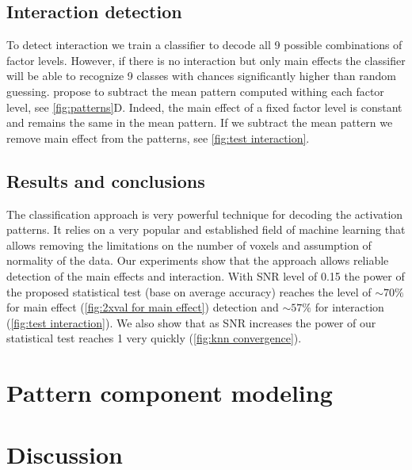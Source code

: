\documentclass[paper=a4,fontsize=12pt]{scrartcl}
\numberwithin{equation}{section} %
\numberwithin{figure}{section} %
\numberwithin{table}{section} %
\begin{document}
\subsection{Interaction detection}

To detect interaction  we train a classifier to decode all 9 possible combinations of factor levels. However, if there is no interaction but only main effects the classifier will be able to recognize 9 classes with chances significantly higher than random guessing. \cite{Kornysheva2014} propose to subtract the mean pattern computed withing each factor level, see \autoref{fig:patterns}D. Indeed, the main effect of a fixed factor level is constant and remains the same in the mean pattern. If we subtract the mean pattern we remove main effect from the patterns, see \autoref{fig:test interaction}.

\subsection{Results and conclusions}

The classification approach is very powerful technique for decoding the activation patterns. It relies on a very popular and established field of machine learning that allows removing the limitations on the number of voxels and assumption of normality of the data. Our experiments show that the approach allows reliable detection of the main effects and interaction. With SNR level of 0.15 the power of the proposed statistical test (base on average accuracy) reaches the level of $\sim70\%$ for main effect (\autoref{fig:2xval for main effect}) detection and $\sim57\%$ for interaction (\autoref{fig:test interaction}). We also show that as SNR increases the power of our statistical test reaches 1 very quickly (\autoref{fig:knn convergence}).

\section{Pattern component modeling}\label{sec:pcm}

\section{Discussion}
\end{document}
